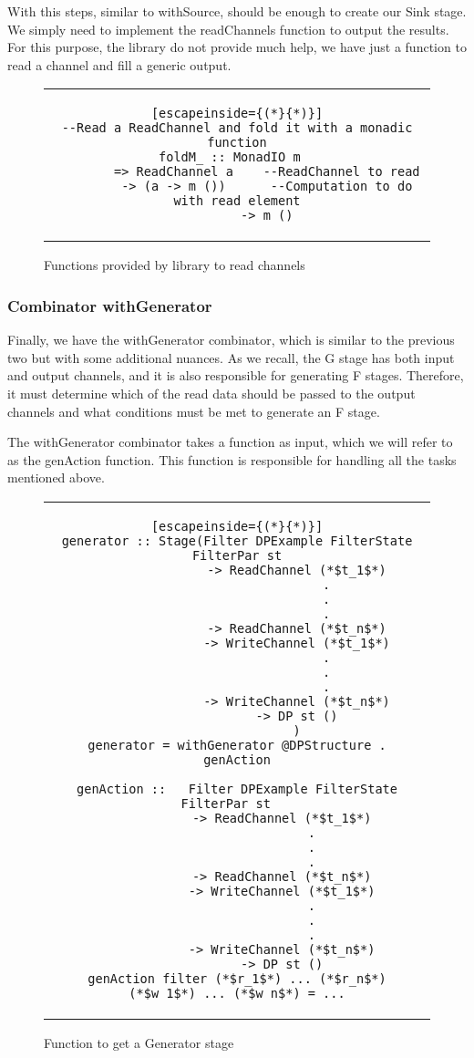 With this steps, similar to withSource, should be enough to create our Sink stage.
We simply need to implement the readChannels function to output the results.
For this purpose, the library do not provide much help, we have just a function to read a channel and fill a generic output.

\begin{figure}[H]
    \begin{tabular}{c}
        \begin{lstlisting}[escapeinside={(*}{*)}]
--Read a ReadChannel and fold it with a monadic function
foldM_ :: MonadIO m	 
        => ReadChannel a    --ReadChannel to read
        -> (a -> m ())      --Computation to do with read element
        -> m ()
        \end{lstlisting}
    \end{tabular}
    \caption{Functions provided by library to read channels}
    \label{fig:HC6}
\end{figure}

\subsubsection*{Combinator withGenerator}
Finally, we have the withGenerator combinator, which is similar to the previous two but with some additional nuances.
As we recall, the G stage has both input and output channels, and it is also responsible for generating F stages.
Therefore, it must determine which of the read data should be passed to the output channels and what conditions must be met to generate an F stage.

The withGenerator combinator takes a function as input, which we will refer to as the genAction function.
This function is responsible for handling all the tasks mentioned above.

\begin{figure}[H]
    \begin{tabular}{c}
        \begin{lstlisting}[escapeinside={(*}{*)}]
generator :: Stage(Filter DPExample FilterState FilterPar st
                -> ReadChannel (*$t_1$*)
                        .
                        .
                        .
                -> ReadChannel (*$t_n$*)
                -> WriteChannel (*$t_1$*)
                        .
                        .
                        .
                -> WriteChannel (*$t_n$*)
                -> DP st ()
                )
generator = withGenerator @DPStructure . genAction

genAction ::   Filter DPExample FilterState FilterPar st   
            -> ReadChannel (*$t_1$*)
                    .
                    .
                    .
            -> ReadChannel (*$t_n$*)
            -> WriteChannel (*$t_1$*)
                    .
                    .
                    .
            -> WriteChannel (*$t_n$*)
            -> DP st ()
genAction filter (*$r_1$*) ... (*$r_n$*) (*$w_1$*) ... (*$w_n$*) = ...
        \end{lstlisting}
    \end{tabular}
    \caption{Function to get a Generator stage}
    \label{fig:HC7}
\end{figure}

